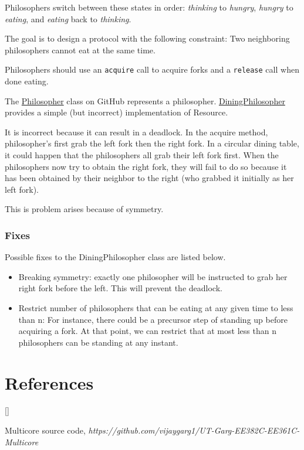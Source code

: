 \documentclass[twoside]{article}
\def\beginrefs{\begin{list}%
        {[\arabic{equation}]}{\usecounter{equation}
         \setlength{\leftmargin}{2.0truecm}\setlength{\labelsep}{0.4truecm}%
         \setlength{\labelwidth}{1.6truecm}}}
\def\endrefs{\end{list}}
\def\bibentry#1{\item[\hbox{[#1]}]}
\begin{document}
Philosophers switch between these states in order: {\it thinking} to {\it hungry}, {\it hungry} to {\it eating}, and {\it eating} back to {\it thinking}.

The goal is to design a protocol with the following constraint: Two neighboring philosophers cannot eat at the same time.

Philosophers should use an {\tt acquire} call to acquire forks and a {\tt release} call when done eating.

The \href{https://github.com/vijaygarg1/UT-Garg-EE382C-EE361C-Multicore/blob/master/chapter3-synchronization_primitives/Philosopher.java}{Philosopher} class on GitHub represents a philosopher. \href{https://github.com/vijaygarg1/UT-Garg-EE382C-EE361C-Multicore/blob/master/chapter3-synchronization_primitives/DiningPhilosopher.java}{DiningPhilosopher} provides a simple (but incorrect) implementation of Resource.

It is incorrect because it can result in a deadlock. In the acquire method, philosopher's first grab the left fork then the right fork. In a circular dining table, it could happen that the philosophers all grab their left fork first. When the philosophers now try to obtain the right fork, they will fail to do so because it has been obtained by their neighbor to the right (who grabbed it initially as her left fork). 

This is problem arises because of symmetry.

\subsubsection{Fixes}

Possible fixes to the DiningPhilosopher class are listed below.

\begin{itemize}
    \item Breaking symmetry: exactly one philosopher will be instructed to grab her right fork before the left. This will prevent the deadlock.
    \item Restrict number of philosophers that can be eating at any given time to less than n: For instance, there could be a precursor step of standing up before acquiring a fork. At that point, we can restrict that at most less than n philosophers can be standing at any instant.
\end{itemize}

\section*{References}
\beginrefs
\bibentry{GitHub}{} Multicore source code, {\it https://github.com/vijaygarg1/UT-Garg-EE382C-EE361C-Multicore}
\endrefs
\end{document}

